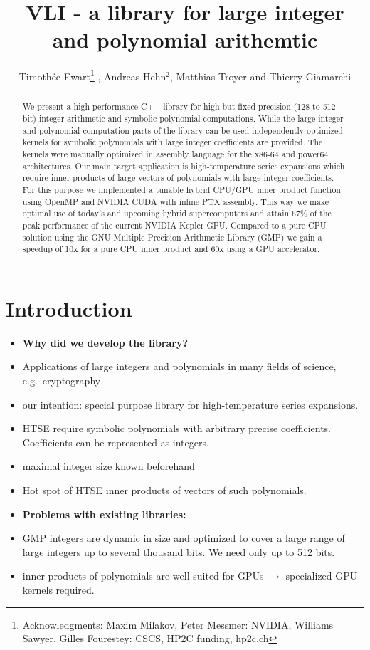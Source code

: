 \documentclass[oribibl]{llncs2e/llncs}
\title{VLI - a library for large integer and polynomial arithemtic}
\author{Timoth\'ee Ewart\inst{1}\thanks{Acknowledgments: Maxim Milakov, Peter Messmer:   NVIDIA,   Williams Sawyer, Gilles Fourestey:  CSCS, HP2C funding, hp2c.ch}  , Andreas Hehn$^2$, Matthias Troyer\inst{2} and Thierry Giamarchi\inst{1}}
\institute{Universit\'e de Gen\`eve, \email{timothee.ewart@gmail.com}  \and Eidgen\"ossische Technische Hochschule Z\"urich }
\begin{document}
\maketitle


\begin{abstract}
We present a high-performance C++ library for high but fixed precision
(128 to 512 bit) integer arithmetic and symbolic polynomial
computations. While the large integer and polynomial computation parts
of the library can be used independently optimized kernels for symbolic
polynomials with large integer coefficients are provided. The kernels
were manually optimized in assembly language for the x86-64 and power64
architectures. Our main target application is high-temperature series
expansions which require inner products of large vectors of polynomials
with large integer coefficients. For this purpose we implemented a
tunable hybrid CPU/GPU inner product function using OpenMP and NVIDIA
CUDA with inline PTX assembly. This way we make optimal use of today's
and upcoming hybrid supercomputers and attain 67\% of the peak
performance of the current NVIDIA Kepler GPU. Compared to a pure CPU
solution using the GNU Multiple Precision Arithmetic Library (GMP) we
gain a speedup of 10x for a pure CPU inner product and 60x using a GPU
accelerator.
\end{abstract}

\section{Introduction}
\begin{itemize}
\item {\bf Why did we develop the library?}
\item Applications of large integers and polynomials in many fields of science, e.g.\ cryptography
\item our intention: special purpose library for high-temperature series expansions.
\item HTSE require symbolic polynomials with arbitrary precise coefficients. Coefficients can be represented as integers.
\item maximal integer size known beforehand
\item Hot spot of HTSE inner products of vectors of such polynomials.
\item {\bf Problems with existing libraries:}
\item GMP integers are dynamic in size and optimized to cover a large range of large integers up to several thousand bits. We need only up to 512 bits.
\item inner products of polynomials are well suited for GPUs $\rightarrow$ specialized GPU kernels required.
\end{itemize}
\end{document}

